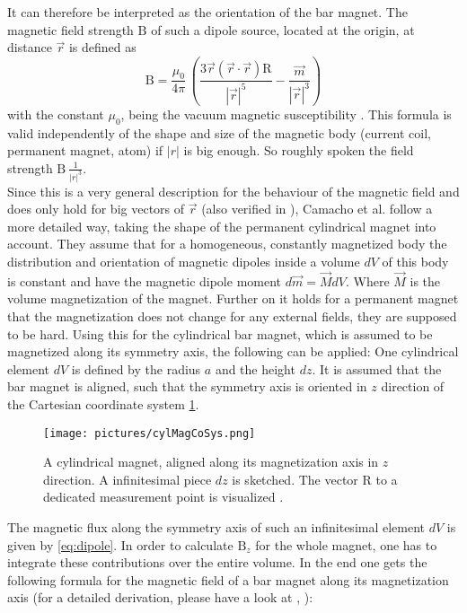 It can therefore be interpreted as the orientation of the bar magnet. The magnetic field strength $ \mathrm{B} $ of such a dipole source, located at the origin, at distance $ \vec{r} $ is defined as
\begin{equation} \label{eq:dipole}
\mathrm{B} = \frac{\mu_{0}}{4 \pi} \, \left (\frac{3 \vec{r} (\vec{r} \cdot \vec{r})\mathrm{R}}{|\vec{r}|^5} -
		\frac{\vec{m}}{|\vec{r}|^3} \right )
\end{equation}
with the constant $ \mu_{0} $, being the vacuum magnetic susceptibility \cite{camacho2013alternative}. This formula is valid independently of the shape and size of the magnetic body (current coil, permanent magnet, atom) if $ |r| $ is big enough. So roughly spoken the field strength $ \mathrm{B} ~ \frac{1}{|r|^ {3}}$.\\
Since this is a very general description for the behaviour of the magnetic field and does only hold for big vectors of $ \vec{r} $ (also verified in ), Camacho et al. \cite{camacho2013alternative} follow a more detailed way, taking the shape of the permanent cylindrical magnet into account. They assume that for a homogeneous, constantly magnetized body the distribution and orientation of magnetic dipoles inside a volume $ dV $ of this body is constant and have the magnetic dipole moment $ d\vec{m} = \vec{M}dV $. Where $ \vec{M} $ is the volume magnetization of the magnet. Further on it holds for a permanent magnet that the magnetization does not change for any external fields, they are supposed to be hard. Using this for the cylindrical bar magnet, which is assumed to be magnetized along its symmetry axis, the following can be applied: One cylindrical element $ dV $ is defined by the radius $ a $ and the height $ dz $. It is assumed that the bar magnet is aligned, such that the symmetry axis is oriented in $ z $ direction of the Cartesian coordinate system \ref{fig:cylMag}.
\begin{figure}
\centering
\texttt{[image: pictures/cylMagCoSys.png]}
\caption{A cylindrical magnet, aligned along its magnetization axis in $ z $ direction. A infinitesimal piece $ dz $ is sketched. The vector R to a dedicated measurement point is visualized \cite{derby2010cylindrical}.}
\label{fig:cylMag}
\end{figure}
The magnetic flux along the symmetry axis of such an infinitesimal element $ dV $ is given by \ref{eq:dipole}. In order to calculate $ \mathrm{B}_{z} $ for the whole magnet, one has to integrate these contributions over the entire volume. In the end one gets the following formula for the magnetic field of a bar magnet along its magnetization axis (for a detailed derivation, please have a look at \cite{camacho2013alternative}, \cite{derby2010cylindrical}):

